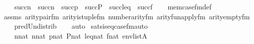 \begin{isabellebody}
\ \ \ \ succ{\isacharparenleft}{\kern0pt}n{}{\isacharparenright}{\kern0pt}\ {\isasymunion}\ succ{\isacharparenleft}{\kern0pt}n{}{\isacharparenright}{\kern0pt}\ {\isasymunion}\ succ{\isacharparenleft}{\kern0pt}p{\isacharparenright}{\kern0pt}\ {\isasymunion}\ succ{\isacharparenleft}{\kern0pt}P{\isacharparenright}{\kern0pt}\ {\isasymunion}\ succ{\isacharparenleft}{\kern0pt}leq{\isacharparenright}{\kern0pt}\ {\isasymunion}\ succ{\isacharparenleft}{\kern0pt}f{\isacharparenright}{\kern0pt}{\isachardoublequoteclose}\isanewline
%
\isadelimproof
\ \ %
\endisadelimproof
%
\isatagproof
{}\isamarkupfalse%
\ mem{\isacharunderscore}{\kern0pt}case{\isacharunderscore}{\kern0pt}fm{\isacharunderscore}{\kern0pt}def\isanewline
\ \ \isamarkupfalse%
\ assms\ arity{\isacharunderscore}{\kern0pt}pair{\isacharunderscore}{\kern0pt}fm\ arity{\isacharunderscore}{\kern0pt}is{\isacharunderscore}{\kern0pt}tuple{\isacharunderscore}{\kern0pt}fm\ number{}arity{\isacharunderscore}{\kern0pt}{\isacharunderscore}{\kern0pt}fm\ arity{\isacharunderscore}{\kern0pt}fun{\isacharunderscore}{\kern0pt}apply{\isacharunderscore}{\kern0pt}fm\ arity{\isacharunderscore}{\kern0pt}empty{\isacharunderscore}{\kern0pt}fm\isanewline
\ \ \ \ pred{\isacharunderscore}{\kern0pt}Un{\isacharunderscore}{\kern0pt}distrib\isanewline
\ \ \isamarkupfalse%
\ auto%
\endisatagproof
{\isafoldproof}%
%
\isadelimproof
\isanewline
%
\endisadelimproof
\isanewline
{}\isamarkupfalse%
\ sats{\isacharunderscore}{\kern0pt}is{\isacharunderscore}{\kern0pt}eq{\isacharunderscore}{\kern0pt}case{\isacharunderscore}{\kern0pt}fm{\isacharunderscore}{\kern0pt}auto{\isacharcolon}{\kern0pt}\isanewline
\ \ \isanewline
\ \ \ \ {\isachardoublequoteopen}n{}{\isasymin}nat{\isachardoublequoteclose}\ {\isachardoublequoteopen}n{}{\isasymin}nat{\isachardoublequoteclose}\ {\isachardoublequoteopen}p{\isasymin}nat{\isachardoublequoteclose}\ {\isachardoublequoteopen}P{\isasymin}nat{\isachardoublequoteclose}\ {\isachardoublequoteopen}leq{\isasymin}nat{\isachardoublequoteclose}\ {\isachardoublequoteopen}f{\isasymin}nat{\isachardoublequoteclose}\ {\isachardoublequoteopen}env{\isasymin}list{\isacharparenleft}{\kern0pt}A{\isacharparenright}{\kern0pt}{\isachardoublequoteclose}\isanewline
\ \ \isanewline

\end{isabellebody}
